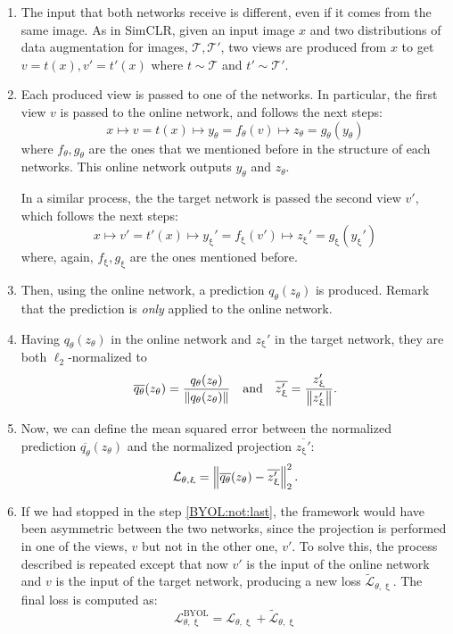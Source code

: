 \begin{enumerate}
\item The input that both networks receive is different, even if it comes from the same image. As in SimCLR, given an input image $x$ and two distributions of data augmentation for images, $\mathcal T, \mathcal T'$, two views are produced from $x$ to get $v = t(x), v' = t'(x)$ where $t \sim \mathcal T $ and $t' \sim \mathcal T'$.

\item Each produced view is passed to one of the networks. In particular, the first view $v$ is passed to the online network, and follows the next steps:
\[
x \longmapsto v = t(x) \longmapsto y_\theta = f_\theta(v) \longmapsto z_\theta =  g_\theta(y_\theta)    
\]
where $f_\theta,g_\theta$ are the ones that we mentioned before in the structure of each networks. This online network outputs $y_\theta$ and $z_\theta$.

In a similar process, the the target network is passed the second view $v'$, which follows the next steps:
\[
x \longmapsto v' = t'(x) \longmapsto y_\upxi' = f_\upxi(v') \longmapsto z_\upxi' = g_\upxi(y_\upxi')   
\]
where, again, $f_\upxi,g_\upxi$ are the ones mentioned before.


\item Then, using the online network, a prediction $q_\theta(z_\theta)$ is produced. Remark that the prediction is \emph{only} applied to the online network.

\item Having $q_\theta(z_\theta)$ in the online network and $z_\upxi'$ in the target network, they are both $\ell_2$-normalized to
\[
\overline{q_\theta}(z_\theta) = \frac{q_\theta(z_\theta)}{\left\lVert q_\theta(z_\theta)\right\rVert} \quad \text{and} \quad \overline{z_\upxi'} = \frac{z_\upxi'}{\left\lVert z_\upxi'\right\rVert}. 
\]

\item \label{BYOL:not:last} Now, we can define the mean squared error between the normalized prediction $\overline{q_\theta}(z_\theta)$ and the normalized projection $\overline{z_\upxi'}$:
\[
\mathcal L_{\theta,\upxi} = \left\lVert\overline{q_\theta}(z_\theta) - \overline{z_\upxi'}\right\rVert_2^2. 
\]

\item If we had stopped in the step \ref{BYOL:not:last}, the framework would have been asymmetric between the two networks, since the projection is performed in one of the views, $v$ but not in the other one, $v'$. To solve this, the process described is repeated except that now $v'$ is the input of the online network and $v$ is the input of the target network, producing a new loss $\tilde{\mathcal L}_{\theta,\upxi}$. The final loss is computed as:
\begin{equation}\label{Loss:BYOL}
\mathcal L_{\theta,\upxi}^{\operatorname{BYOL}}     = \mathcal L_{\theta,\upxi} + \tilde{\mathcal L}_{\theta,\upxi} 
\end{equation}
\end{enumerate}

